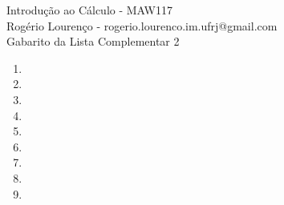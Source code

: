 \documentclass{article}
\begin{document}
\begin{flushleft}
	Introdução ao Cálculo - MAW117\\
	Rogério Lourenço - rogerio.lourenco.im.ufrj@gmail.com\\
	Gabarito da Lista Complementar 2
\end{flushleft}

\begin{enumerate}
	\item
	\item
	\item
	\item
	\item
	\item
	\item
	\item
	\item
\end{enumerate}
\end{document}
